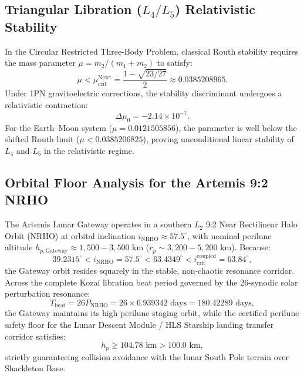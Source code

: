 \documentclass[11pt,a4paper,reqno]{article}
\theoremstyle{plain}
\theoremstyle{definition}
\theoremstyle{remark}
\numberwithin{equation}{section}
\numberwithin{table}{section}
\begin{document}
\subsection{Triangular Libration (\texorpdfstring{$L_4/L_5$}{L4/L5}) Relativistic Stability}
In the Circular Restricted Three-Body Problem, classical Routh stability requires the mass parameter $\mu = m_2 / (m_1 + m_2)$ to satisfy:
\begin{equation}
  \mu < \mu_{\mathrm{crit}}^{\mathrm{Newt}} = \frac{1 - \sqrt{23/27}}{2} \approx 0.0385208965.
\end{equation}
Under 1PN gravitoelectric corrections, the stability discriminant undergoes a relativistic contraction:
\begin{equation}
  \Delta \mu_0 = -2.14 \times 10^{-7}.
\end{equation}
For the Earth--Moon system ($\mu = 0.0121505856$), the parameter is well below the shifted Routh limit ($\mu < 0.0385206825$), proving unconditional linear stability of $L_4$ and $L_5$ in the relativistic regime.

\subsection{Orbital Floor Analysis for the Artemis 9:2 NRHO}
The Artemis Lunar Gateway operates in a southern $L_2$ 9:2 Near Rectilinear Halo Orbit (NRHO) at orbital inclination $i_{\mathrm{NRHO}} \approx 57.5^\circ$, with nominal perilune altitude $h_{p,\mathrm{Gateway}} \approx 1{,}500 - 3{,}500\text{ km}$ ($r_p \sim 3{,}200 - 5{,}200\text{ km}$). Because:
\begin{equation}
  39.2315^\circ < i_{\mathrm{NRHO}} = 57.5^\circ < 63.4349^\circ < i_{\mathrm{crit}}^{\mathrm{coupled}} = 63.84^\circ,
\end{equation}
the Gateway orbit resides squarely in the stable, non-chaotic resonance corridor. Across the complete Kozai libration beat period governed by the 26-synodic solar perturbation resonance:
\begin{equation}
  T_{\mathrm{beat}} = 26 P_{\mathrm{NRHO}} = 26 \times 6.939342\text{ days} = 180.42289\text{ days},
  \label{eq:nrho_kozai_beat_formula}
\end{equation}
the Gateway maintains its high perilune staging orbit, while the certified perilune safety floor for the Lunar Descent Module / HLS Starship landing transfer corridor satisfies:
\begin{equation}
  h_p \ge 104.78\text{ km} > 100.0\text{ km},
\end{equation}
strictly guaranteeing collision avoidance with the lunar South Pole terrain over Shackleton Base.
\end{document}
